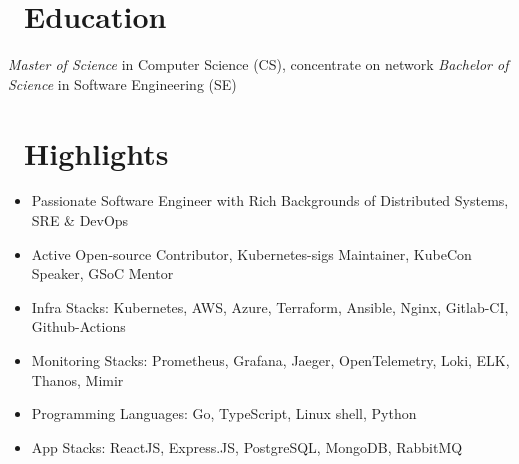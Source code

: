 \documentclass{resume}
\begin{document}



\section{\faGraduationCap\ Education}
\textit{Master of Science} in Computer Science (CS), concentrate on network
\textit{Bachelor of Science} in Software Engineering (SE)

\section{\faCogs\ Highlights}
\begin{itemize}[parsep=0.5ex]
  \item Passionate Software Engineer with Rich Backgrounds of Distributed Systems, SRE \& DevOps
  \item Active Open-source Contributor, Kubernetes-sigs Maintainer, KubeCon Speaker, GSoC Mentor
  \item Infra Stacks: Kubernetes, AWS, Azure, Terraform, Ansible, Nginx, Gitlab-CI, Github-Actions
  \item Monitoring Stacks: Prometheus, Grafana, Jaeger, OpenTelemetry, Loki, ELK, Thanos, Mimir
  \item Programming Languages: Go, TypeScript, Linux shell, Python
  \item App Stacks: ReactJS, Express.JS, PostgreSQL, MongoDB, RabbitMQ
\end{itemize}
\end{document}
